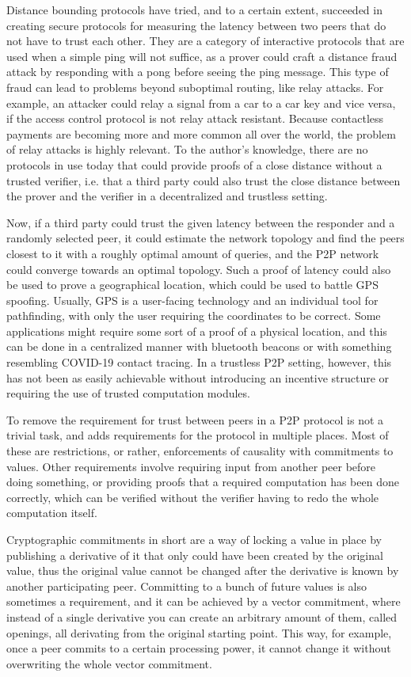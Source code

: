 Distance bounding protocols have tried, and to a certain extent, succeeded in creating secure protocols for measuring the latency between two peers that do not have to trust each other. They are a category of interactive protocols that are used when a simple ping will not suffice, as a prover could craft a distance fraud attack by responding with a pong before seeing the ping message. This type of fraud can lead to problems beyond suboptimal routing, like relay attacks. For example, an attacker could relay a signal from a car to a car key and vice versa, if the access control protocol is not relay attack resistant. Because contactless payments are becoming more and more common all over the world, the problem of relay attacks is highly relevant. To the author's knowledge, there are no protocols in use today that could provide proofs of a close distance without a trusted verifier, i.e. that a third party could also trust the close distance between the prover and the verifier in a decentralized and trustless setting.

Now, if a third party could trust the given latency between the responder and a randomly selected peer, it could estimate the network topology and find the peers closest to it with a roughly optimal amount of queries, and the P2P network could converge towards an optimal topology. Such a proof of latency could also be used to prove a geographical location, which could be used to battle GPS spoofing. Usually, GPS is a user-facing technology and an individual tool for pathfinding, with only the user requiring the coordinates to be correct. Some applications might require some sort of a proof of a physical location, and this can be done in a centralized manner with bluetooth beacons or with something resembling COVID-19 contact tracing. In a trustless P2P setting, however, this has not been as easily achievable without introducing an incentive structure or requiring the use of trusted computation modules.

To remove the requirement for trust between peers in a P2P protocol is not a trivial task, and adds requirements for the protocol in multiple places. Most of these are restrictions, or rather, enforcements of causality with commitments to values. Other requirements involve requiring input from another peer before doing something, or providing proofs that a required computation has been done correctly, which can be verified without the verifier having to redo the whole computation itself.

Cryptographic commitments in short are a way of locking a value in place by publishing a derivative of it that only could have been created by the original value, thus the original value cannot be changed after the derivative is known by another participating peer. Committing to a bunch of future values is also sometimes a requirement, and it can be achieved by a vector commitment, where instead of a single derivative you can create an arbitrary amount of them, called openings, all derivating from the original starting point. This way, for example, once a peer commits to a certain processing power, it cannot change it without overwriting the whole vector commitment.



